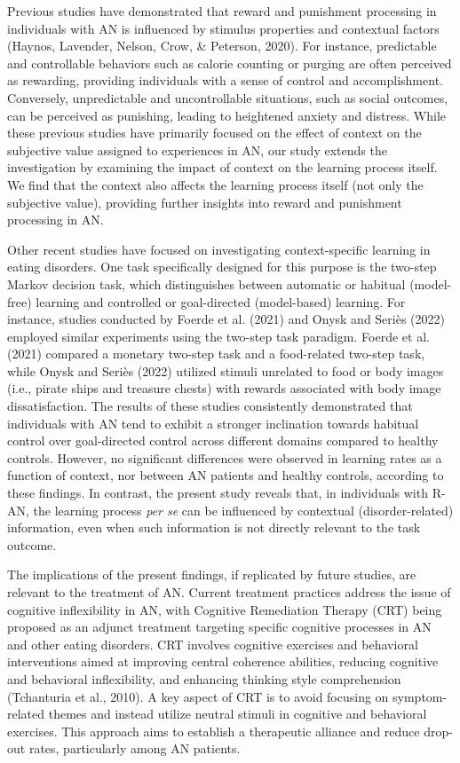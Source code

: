 \documentclass[
  man,floatsintext]{apa6}
\begin{document}
Previous studies have demonstrated that reward and punishment processing in individuals with AN is influenced by stimulus properties and contextual factors (Haynos, Lavender, Nelson, Crow, \& Peterson, 2020). For instance, predictable and controllable behaviors such as calorie counting or purging are often perceived as rewarding, providing individuals with a sense of control and accomplishment. Conversely, unpredictable and uncontrollable situations, such as social outcomes, can be perceived as punishing, leading to heightened anxiety and distress. While these previous studies have primarily focused on the effect of context on the subjective value assigned to experiences in AN, our study extends the investigation by examining the impact of context on the learning process itself. We find that the context also affects the learning process itself (not only the subjective value), providing further insights into reward and punishment processing in AN.

Other recent studies have focused on investigating context-specific learning in eating disorders. One task specifically designed for this purpose is the two-step Markov decision task, which distinguishes between automatic or habitual (model-free) learning and controlled or goal-directed (model-based) learning. For instance, studies conducted by Foerde et al. (2021) and Onysk and Seriès (2022) employed similar experiments using the two-step task paradigm. Foerde et al. (2021) compared a monetary two-step task and a food-related two-step task, while Onysk and Seriès (2022) utilized stimuli unrelated to food or body images (i.e., pirate ships and treasure chests) with rewards associated with body image dissatisfaction. The results of these studies consistently demonstrated that individuals with AN tend to exhibit a stronger inclination towards habitual control over goal-directed control across different domains compared to healthy controls. However, no significant differences were observed in learning rates as a function of context, nor between AN patients and healthy controls, according to these findings. In contrast, the present study reveals that, in individuals with R-AN, the learning process \emph{per se} can be influenced by contextual (disorder-related) information, even when such information is not directly relevant to the task outcome.

The implications of the present findings, if replicated by future studies, are relevant to the treatment of AN. Current treatment practices address the issue of cognitive inflexibility in AN, with Cognitive Remediation Therapy (CRT) being proposed as an adjunct treatment targeting specific cognitive processes in AN and other eating disorders. CRT involves cognitive exercises and behavioral interventions aimed at improving central coherence abilities, reducing cognitive and behavioral inflexibility, and enhancing thinking style comprehension (Tchanturia et al., 2010). A key aspect of CRT is to avoid focusing on symptom-related themes and instead utilize neutral stimuli in cognitive and behavioral exercises. This approach aims to establish a therapeutic alliance and reduce drop-out rates, particularly among AN patients.
\end{document}
